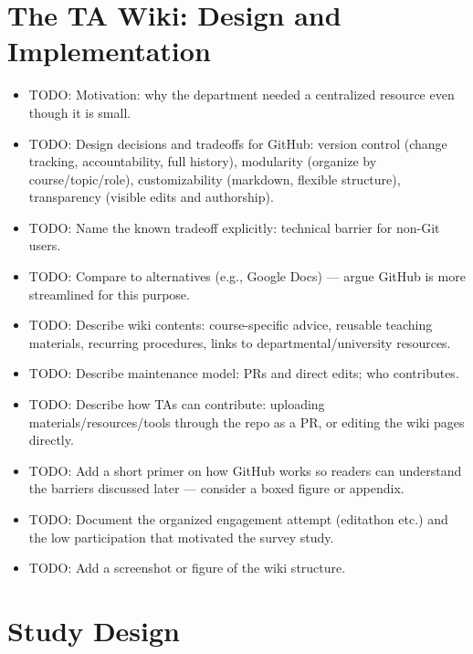 \documentclass[11pt]{article}
\newcommand{\td}[1]{\item \textcolor{red!70!black}{TODO: #1}}
\begin{document}
\section{The TA Wiki: Design and Implementation}

\begin{itemize}
  \td{Motivation: why the department needed a centralized resource even though it is small.}
  \td{Design decisions and tradeoffs for GitHub: version control (change tracking, accountability, full history), modularity (organize by course/topic/role), customizability (markdown, flexible structure), transparency (visible edits and authorship).}
  \td{Name the known tradeoff explicitly: technical barrier for non-Git users.}
  \td{Compare to alternatives (e.g., Google Docs) --- argue GitHub is more streamlined for this purpose.}
  \td{Describe wiki contents: course-specific advice, reusable teaching materials, recurring procedures, links to departmental/university resources.}
  \td{Describe maintenance model: PRs and direct edits; who contributes.}
  \td{Describe how TAs can contribute: uploading materials/resources/tools through the repo as a PR, or editing the wiki pages directly.}
  \td{Add a short primer on how GitHub works so readers can understand the barriers discussed later --- consider a boxed figure or appendix.}
  \td{Document the organized engagement attempt (editathon etc.) and the low participation that motivated the survey study.}
  \td{Add a screenshot or figure of the wiki structure.}
\end{itemize}

\section{Study Design}
\end{document}
